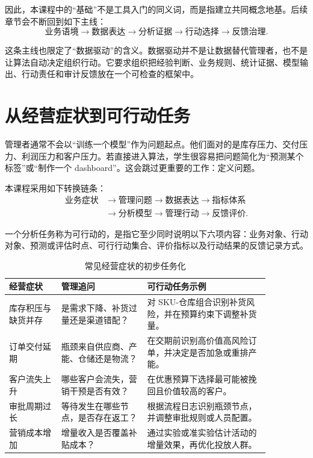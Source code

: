 \documentclass[UTF8,fontset=fandol,openany,zihao=-4]{ctexbook}
\begin{document}
因此，本课程中的“基础”不是工具入门的同义词，而是指建立共同概念地基。后续章节会不断回到如下主线：
\[
\text{业务语境}
\rightarrow
\text{数据表达}
\rightarrow
\text{分析证据}
\rightarrow
\text{行动选择}
\rightarrow
\text{反馈治理}.
\]

这条主线也限定了“数据驱动”的含义。数据驱动并不是让数据替代管理者，也不是让算法自动决定组织行动。它要求组织把经验判断、业务规则、统计证据、模型输出、行动责任和审计反馈放在一个可检查的框架中。

\section{从经营症状到可行动任务}

管理者通常不会以“训练一个模型”作为问题起点。他们面对的是库存压力、交付压力、利润压力和客户压力。若直接进入算法，学生很容易把问题简化为“预测某个标签”或“制作一个 dashboard”。这会跳过更重要的工作：定义问题。

本课程采用如下转换链条：
\[
\begin{aligned}
\text{业务症状}
&\longrightarrow
\text{管理问题}
\longrightarrow
\text{数据表达}
\longrightarrow
\text{指标体系}\\
&\longrightarrow
\text{分析模型}
\longrightarrow
\text{管理行动}
\longrightarrow
\text{反馈评价}.
\end{aligned}
\]

\begin{definition}[可行动分析任务]
一个分析任务称为可行动的，是指它至少同时说明以下六项内容：业务对象、行动对象、预测或评估时点、可行行动集合、评价指标以及行动结果的反馈记录方式。
\end{definition}

\begin{table}[htbp]
\centering
\caption{常见经营症状的初步任务化}
\begin{tabular}{p{0.17\linewidth}p{0.29\linewidth}p{0.40\linewidth}}
\toprule
经营症状 & 管理追问 & 可行动任务示例\\
\midrule
库存积压与缺货并存 & 是需求下降、补货过量还是渠道错配？ & 对 SKU-仓库组合识别补货风险，并在预算约束下调整补货量。\\
订单交付延期 & 瓶颈来自供应商、产能、仓储还是物流？ & 在交期前识别高价值高风险订单，并决定是否加急或重排产能。\\
客户流失上升 & 哪些客户会流失，营销干预是否有效？ & 在优惠预算下选择最可能被挽回且价值较高的客户。\\
审批周期过长 & 等待发生在哪些节点，是否存在返工？ & 根据流程日志识别瓶颈节点，并调整审批规则或人员配置。\\
营销成本增加 & 增量收入是否覆盖补贴成本？ & 通过实验或准实验估计活动的增量效果，再优化投放人群。\\
\bottomrule
\end{tabular}
\end{table}
\end{document}
